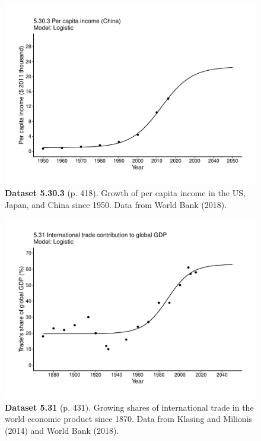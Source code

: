 \documentclass[aps,rmp,preprint,superscriptaddress,10pt,onecolumn]{article}
\begin{document}
\clearpage
\begin{figure}[h]
\includegraphics[width=\textwidth]{output/figs-ggplot/5.30.3.pdf}
\caption*{\textbf{Dataset 5.30.3} (p. 418). Growth of per capita income in the US, Japan, and China since 1950. Data from World Bank (2018).}
\end{figure}
	
\clearpage
\begin{figure}[h]
\includegraphics[width=\textwidth]{output/figs-ggplot/5.31.pdf}
\caption*{\textbf{Dataset 5.31} (p. 431). Growing shares of international trade in the world economic product since 1870. Data from Klasing and Milionis (2014) and World Bank (2018).}
\end{figure}
	
\end{document}
